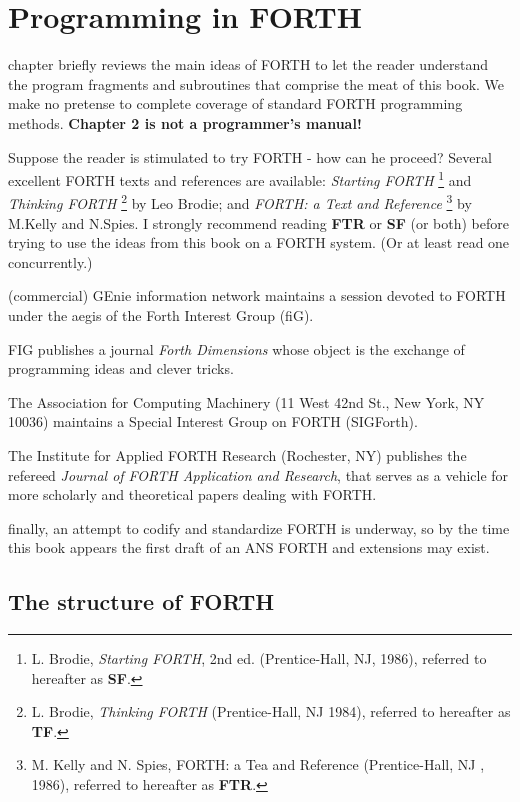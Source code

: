 ﻿\chapter{Programming in FORTH}

 chapter briefly reviews the main ideas of FORTH to let the reader understand the program fragments and subroutines that comprise the meat of this book. We make no pretense to complete coverage of standard FORTH programming methods. \textbf{Chapter 2 is not a programmer’s manual!}

Suppose the reader is stimulated to try FORTH - how can he proceed? Several excellent FORTH texts and references are available: \textit{Starting FORTH} \footnote{L. Brodie, \textit{Starting FORTH}, 2nd ed. (Prentice-Hall, NJ, 1986), referred to hereafter as \textbf{SF}.} and \textit{Thinking FORTH} \footnote{L. Brodie, \textit{Thinking FORTH} (Prentice-Hall, NJ 1984), referred to hereafter as \textbf{TF}.} by Leo Brodie; and \textit{ FORTH: a Text and Reference} \footnote{M. Kelly and N. Spies, FORTH: a Tea and Reference (Prentice-Hall, NJ , 1986), referred to hereafter as \textbf{FTR}.} by M.Kelly and N.Spies. I strongly recommend reading \textbf{FTR} or \textbf{SF} (or both) before trying to use the ideas from this book on a FORTH system. (Or at least read one concurrently.)

 (commercial) GEnie information network maintains a session devoted to FORTH under the aegis of the Forth Interest Group (fiG).

FIG publishes a journal \textit{Forth Dimensions} whose object is the exchange of programming ideas and clever tricks.

The Association for Computing Machinery (11 West 42nd St., New York, NY 10036) maintains a Special Interest Group on FORTH (SIGForth).

The Institute for Applied FORTH Research (Rochester, NY) publishes the refereed \textit{Journal of FORTH Application and Research}, that serves as a vehicle for more scholarly and theoretical papers dealing with FORTH.

finally, an attempt to codify and standardize FORTH is underway, so by the time this book appears the first draft of an ANS FORTH and extensions may exist.

\section{The structure of FORTH}


